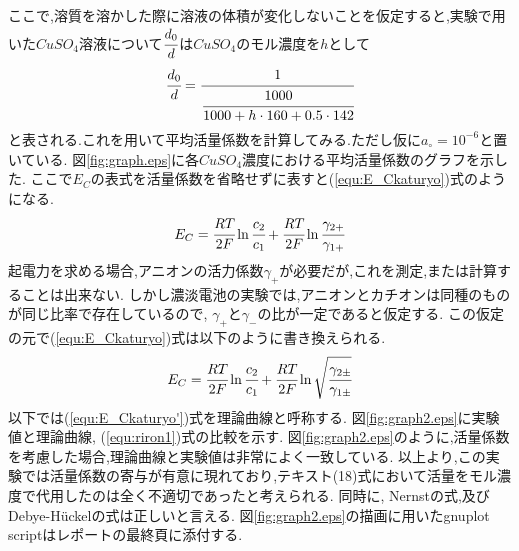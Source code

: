 ここで,溶質を溶かした際に溶液の体積が変化しないことを仮定すると,実験で用いた$CuSO_4$溶液について$\cfrac{d_0}{d}$は$CuSO_4$のモル濃度を$h$として
\begin{equation}
  \label{equ:h}
  \cfrac{d_0}{d}=\cfrac{1}{\cfrac{1000}{1000+h\cdot160+0.5\cdot142}}
\end{equation}
と表される.これを用いて平均活量係数を計算してみる.ただし仮に$a_{\circ}=10^{-6}$と置いている.
図\ref{fig:graph.eps}に各$CuSO_4$濃度における平均活量係数のグラフを示した.
ここで$E_C$の表式を活量係数を省略せずに表すと(\ref{equ:E_Ckaturyo})式のようになる.
\begin{equation}
  \label{equ:E_Ckaturyo}
  E_C=\cfrac{RT}{2F}\ln \cfrac{c_2}{c_1} + \cfrac{RT}{2F}\ln \cfrac{\gamma_{2+}}{\gamma_{1+}}
\end{equation}
起電力を求める場合,アニオンの活力係数$\gamma_+$が必要だが,これを測定,または計算することは出来ない\cite{kakiuchi2016}.
しかし濃淡電池の実験では,アニオンとカチオンは同種のものが同じ比率で存在しているので, $\gamma_{+}$と$\gamma_{-}$の比が一定であると仮定する.
この仮定の元で(\ref{equ:E_Ckaturyo})式は以下のように書き換えられる.
\begin{equation}
  \label{equ:E_Ckaturyo'}
  E_C=\cfrac{RT}{2F}\ln \cfrac{c_2}{c_1} + \cfrac{RT}{2F}\ln \sqrt{\cfrac{\gamma_{2\pm}}{\gamma_{1\pm}}}
\end{equation}
以下では(\ref{equ:E_Ckaturyo'})式を理論曲線と呼称する.
図\ref{fig:graph2.eps}に実験値と理論曲線, (\ref{equ:riron1})式の比較を示す.
図\ref{fig:graph2.eps}のように,活量係数を考慮した場合,理論曲線と実験値は非常によく一致している.
以上より,この実験では活量係数の寄与が有意に現れており,テキスト(18)式において活量をモル濃度で代用したのは全く不適切であったと考えられる.
同時に, Nernstの式,及びDebye-H\"{u}ckelの式は正しいと言える.
図\ref{fig:graph2.eps}の描画に用いたgnuplot scriptはレポートの最終頁に添付する.
